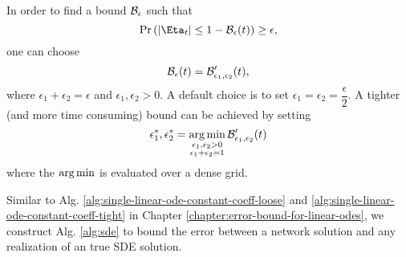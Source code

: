     In order to find a bound $\mathcal{B}_\epsilon$ such that 
    \begin{equation}\label{eq:sde-bound-probability}
        \P{|\Eta_t| \leq 1 - \Bound_{\epsilon}(t)} \geq \epsilon,
    \end{equation}
    one can choose 
    \begin{equation}\label{eq:sde-bound-construction}
        \mathcal{B}_{\epsilon}(t) = \mathcal{B}'_{\epsilon_1, \epsilon_2}(t),
    \end{equation}
    where $\epsilon_1 + \epsilon_2 = \epsilon$ and $\epsilon_1, \epsilon_2 > 0$.
    A default choice is to set $\epsilon_1 = \epsilon_2 = \dfrac{\epsilon}{2}$.
    A tighter (and more time consuming) bound can be achieved by setting
    \begin{equation}
        \epsilon_1^*, \epsilon_2^* = \operatorname*{arg\,min}_{\substack{\epsilon_1, \epsilon_2 > 0 \\ \epsilon_1 + \epsilon_2 = 1}} \mathcal{B}'_{\epsilon_1, \epsilon_2}(t)
    \end{equation}
    where the $\operatorname*{arg\,min}$ is evaluated over a dense grid.

    Similar to Alg. \ref{alg:single-linear-ode-constant-coeff-loose} and \ref{alg:single-linear-ode-constant-coeff-tight} in Chapter \ref{chapter:error-bound-for-linear-odes}, we construct Alg. \ref{alg:sde} to bound the error between a network solution and any realization of an true SDE solution.
    
